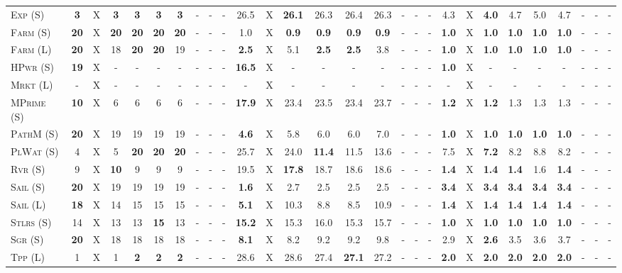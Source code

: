 \documentclass[11pt,landscape]{article}
\begin{document}
\begin{table*}[tb]
{\begin{tabular}{|l||ccccccccc||ccccccccc||ccccccccc||}
\textsc{Exp} (S)&\textbf{3}&X&\textbf{3}&\textbf{3}&\textbf{3}&\textbf{3}&-&-&-&26.5&X&\textbf{26.1}&26.3&26.4&26.3&-&-&-&4.3&X&\textbf{4.0}&4.7&5.0&4.7&-&-&-\\
\textsc{Farm} (S)&\textbf{20}&X&\textbf{20}&\textbf{20}&\textbf{20}&\textbf{20}&-&-&-&1.0&X&\textbf{0.9}&\textbf{0.9}&\textbf{0.9}&\textbf{0.9}&-&-&-&\textbf{1.0}&X&\textbf{1.0}&\textbf{1.0}&\textbf{1.0}&\textbf{1.0}&-&-&-\\
\textsc{Farm} (L)&\textbf{20}&X&18&\textbf{20}&\textbf{20}&19&-&-&-&\textbf{2.5}&X&5.1&\textbf{2.5}&\textbf{2.5}&3.8&-&-&-&\textbf{1.0}&X&\textbf{1.0}&\textbf{1.0}&\textbf{1.0}&\textbf{1.0}&-&-&-\\
\textsc{HPwr} (S)&\textbf{19}&X&-&-&-&-&-&-&-&\textbf{16.5}&X&-&-&-&-&-&-&-&\textbf{1.0}&X&-&-&-&-&-&-&-\\
\textsc{Mrkt} (L)&-&X&-&-&-&-&-&-&-&-&X&-&-&-&-&-&-&-&-&X&-&-&-&-&-&-&-\\
\textsc{MPrime} (S)&\textbf{10}&X&6&6&6&6&-&-&-&\textbf{17.9}&X&23.4&23.5&23.4&23.7&-&-&-&\textbf{1.2}&X&\textbf{1.2}&1.3&1.3&1.3&-&-&-\\
\textsc{PathM} (S)&\textbf{20}&X&19&19&19&19&-&-&-&\textbf{4.6}&X&5.8&6.0&6.0&7.0&-&-&-&\textbf{1.0}&X&\textbf{1.0}&\textbf{1.0}&\textbf{1.0}&\textbf{1.0}&-&-&-\\
\textsc{PlWat} (S)&4&X&5&\textbf{20}&\textbf{20}&\textbf{20}&-&-&-&25.7&X&24.0&\textbf{11.4}&11.5&13.6&-&-&-&7.5&X&\textbf{7.2}&8.2&8.8&8.2&-&-&-\\
\textsc{Rvr} (S)&9&X&\textbf{10}&9&9&9&-&-&-&19.5&X&\textbf{17.8}&18.7&18.6&18.6&-&-&-&\textbf{1.4}&X&\textbf{1.4}&\textbf{1.4}&1.6&\textbf{1.4}&-&-&-\\
\textsc{Sail} (S)&\textbf{20}&X&19&19&19&19&-&-&-&\textbf{1.6}&X&2.7&2.5&2.5&2.5&-&-&-&\textbf{3.4}&X&\textbf{3.4}&\textbf{3.4}&\textbf{3.4}&\textbf{3.4}&-&-&-\\
\textsc{Sail} (L)&\textbf{18}&X&14&15&15&15&-&-&-&\textbf{5.1}&X&10.3&8.8&8.5&10.9&-&-&-&\textbf{1.4}&X&\textbf{1.4}&\textbf{1.4}&\textbf{1.4}&\textbf{1.4}&-&-&-\\
\textsc{Stlrs} (S)&14&X&13&13&\textbf{15}&13&-&-&-&\textbf{15.2}&X&15.3&16.0&15.3&15.7&-&-&-&\textbf{1.0}&X&\textbf{1.0}&\textbf{1.0}&\textbf{1.0}&\textbf{1.0}&-&-&-\\
\textsc{Sgr} (S)&\textbf{20}&X&18&18&18&18&-&-&-&\textbf{8.1}&X&8.2&9.2&9.2&9.8&-&-&-&2.9&X&\textbf{2.6}&3.5&3.6&3.7&-&-&-\\
\textsc{Tpp} (L)&1&X&1&\textbf{2}&\textbf{2}&\textbf{2}&-&-&-&28.6&X&28.6&27.4&\textbf{27.1}&27.2&-&-&-&\textbf{2.0}&X&\textbf{2.0}&\textbf{2.0}&\textbf{2.0}&\textbf{2.0}&-&-&-\\

\end{tabular}}
\end{table*}
\end{document}
